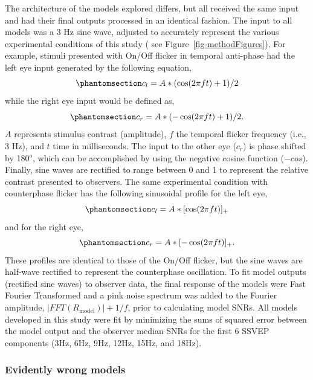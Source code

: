 \documentclass[
  12pt,
]{article}
\begin{document}
The architecture of the models explored differs, but all received the
same input and had their final outputs processed in an identical
fashion. The input to all models was a 3 Hz sine wave, adjusted to
accurately represent the various experimental conditions of this study (
see Figure~\ref{fig-methodFigures}). For example, stimuli presented with
On/Off flicker in temporal anti-phase had the left eye input generated
by the following equation,
\begin{equation}\phantomsection\label{eq-stimInput2L}{
c_l = A * (\cos(2 \pi ft)+1)/2
}\end{equation} while the right eye input would be defined as,
\begin{equation}\phantomsection\label{eq-stimInput2R}{
c_r = A * (-\cos(2 \pi ft)+1)/2.
}\end{equation} \(A\) represents stimulus contrast (amplitude), \(f\)
the temporal flicker frequency (i.e., 3 Hz), and \(t\) time in
milliseconds. The input to the other eye (\(c_r\)) is phase shifted by
180\(^o\), which can be accomplished by using the negative cosine
function (\(-cos\)). Finally, sine waves are rectified to range between
0 and 1 to represent the relative contrast presented to observers. The
same experimental condition with counterphase flicker has the following
sinusoidal profile for the left eye,
\begin{equation}\phantomsection\label{eq-stimInput3L}{
c_l = A * [\cos(2 \pi ft)]_+
}\end{equation} and for the right eye,
\begin{equation}\phantomsection\label{eq-stimInput3R}{
c_r = A * [-\cos(2 \pi ft)]_+.
}\end{equation} These profiles are identical to those of the On/Off
flicker, but the sine waves are half-wave rectified to represent the
counterphase oscillation. To fit model outputs (rectified sine waves) to
observer data, the final response of the models were Fast Fourier
Transformed and a pink noise spectrum was added to the Fourier
amplitude, \(|FFT(R_\text{model})|+1/f\), prior to calculating model
SNRs. All models developed in this study were fit by minimizing the sums
of squared error between the model output and the observer median SNRs
for the first 6 SSVEP components (3Hz, 6Hz, 9Hz, 12Hz, 15Hz, and 18Hz).

\subsubsection{Evidently wrong models}\label{evidently-wrong-models}
\end{document}
